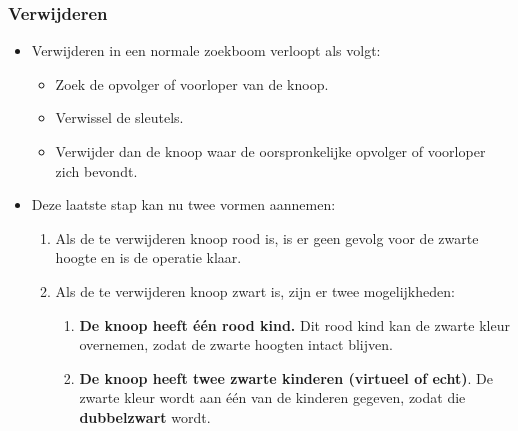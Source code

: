 \subsubsection{Verwijderen}
\begin{itemize}
    \item Verwijderen in een normale zoekboom verloopt als volgt:
    \begin{itemize}
        \item Zoek de opvolger of voorloper van de knoop.
        \item Verwissel de sleutels.
        \item Verwijder dan de knoop waar de oorspronkelijke opvolger of voorloper zich bevondt.
    \end{itemize}
    \item Deze laatste stap kan nu twee vormen aannemen:
    \begin{enumerate}
        \item Als de te verwijderen knoop rood is, is er geen gevolg voor de zwarte hoogte en is de operatie klaar.
        \item Als de te verwijderen knoop zwart is, zijn er twee mogelijkheden:
        \begin{enumerate}
            \item \textbf{De knoop heeft één rood kind.} Dit rood kind kan de zwarte kleur overnemen, zodat de zwarte hoogten intact blijven.
            \item \textbf{De knoop heeft twee zwarte kinderen (virtueel of echt)}. De zwarte kleur wordt aan één van de kinderen gegeven, zodat die \textbf{dubbelzwart} wordt.
        \end{enumerate}
    \end{enumerate}


\end{itemize}
